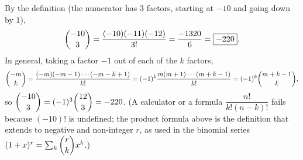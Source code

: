 By the definition (the numerator has $3$ factors, starting at $-10$ and going down by $1$),
\[
\dbinom{-10}{3}=\dfrac{(-10)(-11)(-12)}{3!}=\dfrac{-1320}{6}=\boxed{-220}.
\]
In general, taking a factor $-1$ out of each of the $k$ factors,
\[
\dbinom{-m}{k}=\dfrac{(-m)(-m-1)\cdots(-m-k+1)}{k!}=(-1)^k\dfrac{m(m+1)\cdots(m+k-1)}{k!}=(-1)^k\dbinom{m+k-1}{k},
\]
so $\dbinom{-10}{3}=(-1)^3\dbinom{12}{3}=-220$. (A calculator or a formula $\dfrac{n!}{k!(n-k)!}$ fails because $(-10)!$ is undefined; the product formula above is the definition that extends to negative and non-integer $r$, as used in the binomial series $(1+x)^{r}=\sum_k\dbinom rk x^k$.)
